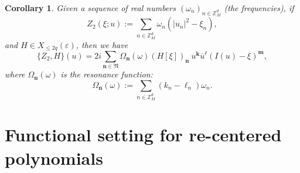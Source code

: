 \documentclass[10pt,a4paper]{amsart}
\theoremstyle{plain}
\newtheorem{corollary}[theorem]{Corollary}
\theoremstyle{definition}
\newcommand{\nb}{{\boldsymbol n}}
\newcommand{\kb}{{\boldsymbol k}}
\newcommand{\lb}{{\boldsymbol \ell}}
\newcommand{\mb}{{\boldsymbol m}}
\newcommand{\Nb}{{\boldsymbol{\mathfrak{N}}}}
\newcommand{\Z}{\mathbb{Z}}
\newcommand{\1}{\mathbf{1}}
\let\epsilon\varepsilon
\begin{document}
\begin{corollary}
Given a sequence of real numbers $(\omega_{n})_{n\in\Z_{M}^{d}}$ (the frequencies), if
\[
Z_{2}(\xi;u) := \sum_{n\in\Z_{M}^{d}}\omega_{n}(|u_{n}|^{2}-\xi_{n}),
\]
and $H\in X_{\leq2q}(\epsilon)$, then we have
\[
\{Z_{2},H\}(u) = 2i\sum_{\nb\in\Nb}\Omega_{\nb}(\omega)(H[\xi])_{\nb}\ u^{\kb}\overline{u}^{\lb}(I(u)-\xi)^{\mb},
\]
where $\Omega_{\nb}(\omega)$ is the resonance function:
\begin{equation}
\label{eq:rf1}
\Omega_{\nb}(\omega) := \sum_{n\in\Z_{M}^{d}}(k_{n}-\ell_{n})\omega_{n}.
\end{equation}
\end{corollary}

\section{Functional setting for re-centered polynomials}
\label{sec:main-nf-su}
\end{document}
